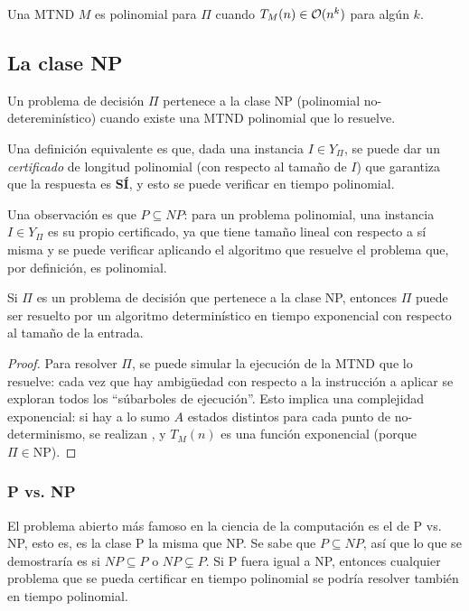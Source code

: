 Una MTND $M$ es polinomial para $\Pi$ cuando $T_M(n) \in \mathcal{O}(n^k)$ para algún $k$.

\subsection{La clase NP}

Un problema de decisión $\Pi$ pertenece a la clase NP (polinomial no-detereminístico) cuando existe una MTND polinomial que lo resuelve.

Una definición equivalente es que, dada una instancia $I \in Y_{\Pi}$, se puede dar un \textit{certificado} de longitud polinomial (con respecto al tamaño de $I$) que garantiza que la respuesta es \textbf{SÍ}, y esto se puede verificar en tiempo polinomial.

Una observación es que $P \subseteq NP$: para un problema polinomial, una instancia $I \in Y_{\Pi}$ es su propio certificado, ya que tiene tamaño lineal con respecto a sí misma y se puede verificar aplicando el algoritmo que resuelve el problema que, por definición, es polinomial.

\begin{theorem*}
    Si $\Pi$ es un problema de decisión que pertenece a la clase NP, entonces $\Pi$ puede ser resuelto por un algoritmo determinístico en tiempo exponencial con respecto al tamaño de la entrada.
\end{theorem*}
\begin{proof}
    Para resolver $\Pi$, se puede simular la ejecución de la MTND que lo resuelve: cada vez que hay ambigüedad con respecto a la instrucción a aplicar se exploran todos los ``súbarboles de ejecución''. Esto implica una complejidad exponencial: si hay a lo sumo $A$ estados distintos para cada punto de no-determinismo, se realizan , y $T_M(n)$ es una función exponencial (porque $\Pi \in \text{NP}$).
\end{proof}

\subsubsection{P vs. NP}

El problema abierto más famoso en la ciencia de la computación es el de P vs. NP, esto es, es la clase P la misma que NP. Se sabe que $P \subseteq NP$, así que lo que se demostraría es si $NP \subseteq P$ o $NP \subsetneq P$. Si P fuera igual a NP, entonces cualquier problema que se pueda certificar en tiempo polinomial se podría resolver también en tiempo polinomial.

